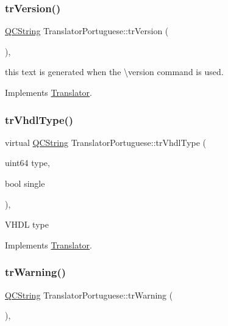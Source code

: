 \subsubsection{\texorpdfstring{trVersion()}{trVersion()}}
{\footnotesize\ttfamily \mbox{\hyperlink{class_q_c_string}{Q\+C\+String}} Translator\+Portuguese\+::tr\+Version (\begin{DoxyParamCaption}{ }\end{DoxyParamCaption})\hspace{0.3cm}{\ttfamily [inline]}, {\ttfamily [virtual]}}

this text is generated when the \textbackslash{}version command is used. 

Implements \mbox{\hyperlink{class_translator}{Translator}}.

\mbox{\label{class_translator_portuguese_a6325d2a54184a560be92f926eecbe323}} 
\subsubsection{\texorpdfstring{trVhdlType()}{trVhdlType()}}
{\footnotesize\ttfamily virtual \mbox{\hyperlink{class_q_c_string}{Q\+C\+String}} Translator\+Portuguese\+::tr\+Vhdl\+Type (\begin{DoxyParamCaption}\item[{uint64}]{type,  }\item[{bool}]{single }\end{DoxyParamCaption})\hspace{0.3cm}{\ttfamily [inline]}, {\ttfamily [virtual]}}

V\+H\+DL type 

Implements \mbox{\hyperlink{class_translator}{Translator}}.

\mbox{\label{class_translator_portuguese_af7a7513d569c37b9133bb8c63e9b6420}} 
\subsubsection{\texorpdfstring{trWarning()}{trWarning()}}
{\footnotesize\ttfamily \mbox{\hyperlink{class_q_c_string}{Q\+C\+String}} Translator\+Portuguese\+::tr\+Warning (\begin{DoxyParamCaption}{ }\end{DoxyParamCaption})\hspace{0.3cm}{\ttfamily [inline]}, {\ttfamily [virtual]}}

